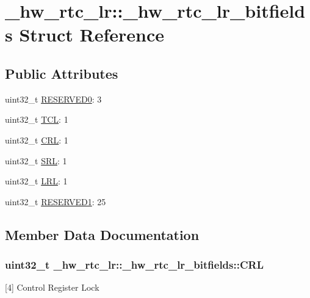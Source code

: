 \hypertarget{struct__hw__rtc__lr_1_1__hw__rtc__lr__bitfields}{}\section{\+\_\+hw\+\_\+rtc\+\_\+lr\+:\+:\+\_\+hw\+\_\+rtc\+\_\+lr\+\_\+bitfields Struct Reference}
\label{struct__hw__rtc__lr_1_1__hw__rtc__lr__bitfields}
\subsection*{Public Attributes}
\begin{DoxyCompactItemize}
\item 
uint32\+\_\+t \hyperlink{struct__hw__rtc__lr_1_1__hw__rtc__lr__bitfields_a9b663cd0636e06347ff844addb774f69}{R\+E\+S\+E\+R\+V\+E\+D0}\+: 3
\item 
uint32\+\_\+t \hyperlink{struct__hw__rtc__lr_1_1__hw__rtc__lr__bitfields_abdabd5035e0036ec6755542a1c1411b6}{T\+CL}\+: 1
\item 
uint32\+\_\+t \hyperlink{struct__hw__rtc__lr_1_1__hw__rtc__lr__bitfields_ae39bce5d1b2698ef1e721a17f5cb1d59}{C\+RL}\+: 1
\item 
uint32\+\_\+t \hyperlink{struct__hw__rtc__lr_1_1__hw__rtc__lr__bitfields_ae0a22727fb62dc9c53ebd7d18e210cc4}{S\+RL}\+: 1
\item 
uint32\+\_\+t \hyperlink{struct__hw__rtc__lr_1_1__hw__rtc__lr__bitfields_ae383ff0b58f1881896bc2dda33cc0475}{L\+RL}\+: 1
\item 
uint32\+\_\+t \hyperlink{struct__hw__rtc__lr_1_1__hw__rtc__lr__bitfields_af92e0a2639b67ba05243781a0be2e9ea}{R\+E\+S\+E\+R\+V\+E\+D1}\+: 25
\end{DoxyCompactItemize}


\subsection{Member Data Documentation}
\subsubsection[{\texorpdfstring{C\+RL}{CRL}}]{\setlength{\rightskip}{0pt plus 5cm}uint32\+\_\+t \+\_\+hw\+\_\+rtc\+\_\+lr\+::\+\_\+hw\+\_\+rtc\+\_\+lr\+\_\+bitfields\+::\+C\+RL}\hypertarget{struct__hw__rtc__lr_1_1__hw__rtc__lr__bitfields_ae39bce5d1b2698ef1e721a17f5cb1d59}{}\label{struct__hw__rtc__lr_1_1__hw__rtc__lr__bitfields_ae39bce5d1b2698ef1e721a17f5cb1d59}
\mbox{[}4\mbox{]} Control Register Lock 
